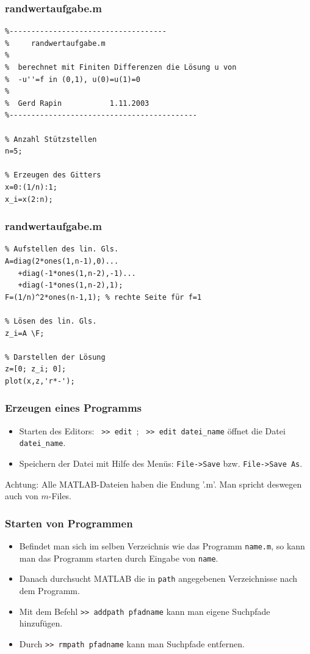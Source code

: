 \begin{frame}[fragile]\frametitle{randwertaufgabe.m}
\begin{lstlisting}
%------------------------------------
%     randwertaufgabe.m 
%   
%  berechnet mit Finiten Differenzen die Lösung u von
%  -u''=f in (0,1), u(0)=u(1)=0
%
%  Gerd Rapin           1.11.2003
%-------------------------------------------

% Anzahl Stützstellen
n=5;

% Erzeugen des Gitters
x=0:(1/n):1;
x_i=x(2:n);
\end{lstlisting}
\end{frame}

\begin{frame}[fragile]\frametitle{randwertaufgabe.m}
\begin{lstlisting}
% Aufstellen des lin. Gls.
A=diag(2*ones(1,n-1),0)...
   +diag(-1*ones(1,n-2),-1)...
   +diag(-1*ones(1,n-2),1);
F=(1/n)^2*ones(n-1,1); % rechte Seite für f=1 

% Lösen des lin. Gls.
z_i=A \F;

% Darstellen der Lösung
z=[0; z_i; 0];
plot(x,z,'r*-');
\end{lstlisting}
\end{frame}

\begin{frame}[fragile]\frametitle{Erzeugen eines Programms}
\begin{itemize}
\item Starten des Editors: \lstinline! >> edit !; \lstinline! >> edit datei_name!
  öffnet die Datei \lstinline!datei_name!.
\item Speichern der Datei mit Hilfe des Menüs: \lstinline!File->Save!
  bzw. \lstinline!File->Save As!.
\end{itemize}
\alert{Achtung:} Alle MATLAB-Dateien haben die Endung '.m'. Man
spricht deswegen auch von $m$-Files.
\end{frame}

\begin{frame}[fragile]\frametitle{Starten von Programmen}
\begin{itemize}
\item Befindet man sich im selben Verzeichnis wie das Programm
  \lstinline!name.m!, so kann man das Programm starten durch Eingabe von  
\lstinline!name!. 
\item Danach durchsucht MATLAB die in \lstinline!path! angegebenen
  Verzeichnisse nach dem Programm.
\item Mit dem Befehl \lstinline!>> addpath pfadname! kann man eigene Suchpfade
  hinzufügen.  
\item Durch \lstinline!>> rmpath pfadname! kann man Suchpfade entfernen.  
\end{itemize}
\end{frame}


